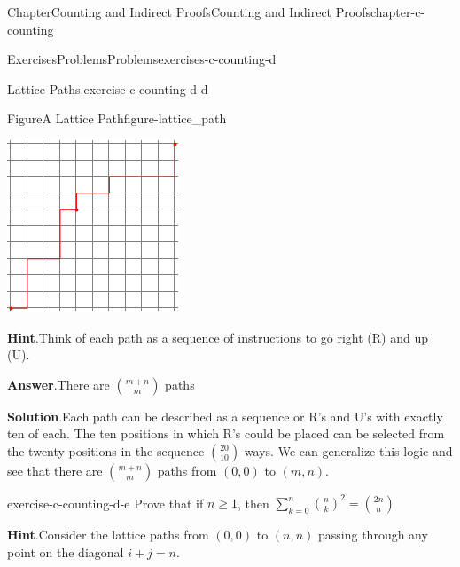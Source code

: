 \documentclass[oneside,10pt,]{book}
\newcommand{\blocktitlefont}{\relax}
\numberwithin{equation}{section}
\begin{document}
\begin{chapterptx}{Chapter}{Counting and Indirect Proofs}{}{Counting and Indirect Proofs}{}{}{chapter-c-counting}
\begin{exercises-section}{Exercises}{Problems}{}{Problems}{}{}{exercises-c-counting-d}
\begin{divisionexercise}{3}{Lattice Paths.}{}{exercise-c-counting-d-d}
\begin{figureptx}{Figure}{A Lattice Path}{figure-lattice_path}{}
\begin{image}{0.2}{0.6}{0.2}
\includegraphics[width=\linewidth]{images/lattice_path.png}
\end{image}%
\tcblower
\end{figureptx}%
\par\smallskip%
\noindent\textbf{\blocktitlefont Hint}.\hypertarget{hint-c-counting-d-d-d}{}\quad{}Think of each path as a sequence of instructions to go right (R) and up (U).%
\par\smallskip%
\noindent\textbf{\blocktitlefont Answer}.\hypertarget{answer-c-counting-d-d-e}{}\quad{}There are \(\binom{m+n}{m}\) paths%
\par\smallskip%
\noindent\textbf{\blocktitlefont Solution}.\hypertarget{solution-c-counting-d-d-f}{}\quad{}Each path can be described as a sequence or R's and U's with exactly ten of each.   The ten positions in which R's could be placed can be selected from the twenty positions in the sequence \(\binom{20}{10}\) ways.  We can generalize this logic and see that there are \(\binom{m+n}{m}\) paths from \((0,0)\) to \((m,n)\).%
\end{divisionexercise}%
\begin{divisionexercise}{4}{}{}{exercise-c-counting-d-e}%
Prove that if \(n\geq 1\), then \(\sum _{k=0}^n \binom{n}{k}^2=\binom{2 n}{n}\)%
\par\smallskip%
\noindent\textbf{\blocktitlefont Hint}.\hypertarget{hint-c-counting-d-e-b}{}\quad{}Consider the lattice paths from \((0,0)\) to \((n,n)\) passing through any point on the diagonal \(i + j = n\).%

\end{divisionexercise}
\end{exercises-section}
\end{chapterptx}
\end{document}
